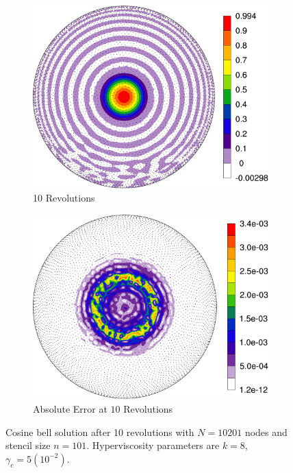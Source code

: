 \documentclass{report}
\begin{document}
\begin{figure}
\begin{center}
\begin{subfigure}[b]{0.55\textwidth}
	\includegraphics[width=1.0\textwidth]{../figures/paper1/cosine_bell/cosineComputedSolution.pdf}
	\caption{10 Revolutions}
	\label{fig:cosine_approx}
\end{subfigure}
\begin{subfigure}[b]{0.55\textwidth}
	\includegraphics[width=1.0\textwidth]{../figures/paper1/cosine_bell/cosineAbsoluteError-eps-converted-to.pdf}
	\caption{Absolute Error at $10$ Revolutions}
	\label{fig:cosine_abserror}
\end{subfigure}
\caption{Cosine bell solution after 10 revolutions with $N=10201$ nodes and stencil size $n=101$.
Hyperviscosity parameters are $k = 8$, $\gamma_c = 5(10^{-2})$.
}
 \label{fig:cosine_10revs}
\end{center}
\end{figure}
\end{document}
